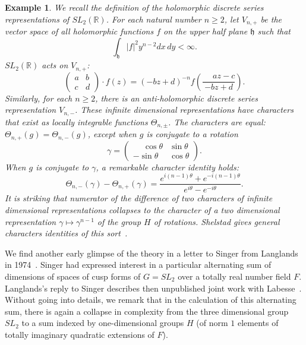 \documentclass[brochure,english,12pt]{bourbaki}
\theoremstyle{plain}
\newtheorem{example}[equation]{Example}
\newcommand{\ring}[1]{\mathbb{#1}}
\begin{document}
\begin{example}\label{ex:sl2}  
  We recall the definition of the holomorphic discrete series
  representations of $SL_2(\ring{R})$.  For each natural number $n\ge
  2$, let $V_{n,+}$ be the vector space of all holomorphic functions
  $f$ on the upper half plane ${\mathfrak h}$ such that
\[
\int_{\mathfrak h} |f|^2 y^{n-2} dx\, dy < \infty.
\]
$SL_2(\ring{R})$ acts on $V_{n,+}$:
\[
\begin{pmatrix} a & b \\ c & d \end{pmatrix} \cdot f(z) = 
(-b z + d ) ^{-n} f (\frac{\phantom{-}a z - c}{-b z + d}).
\]
Similarly, for each $n\ge 2$,  there is an anti-holomorphic discrete series
representation  $V_{n,-}$.  These infinite
dimensional representations have characters that exist as locally integrable
functions $\Theta_{n,\pm}$.  The characters are equal:
$\Theta_{n,+}(g)=\Theta_{n,-}(g)$, except when $g$ is conjugate to a
rotation
\[
\gamma = 
\begin{pmatrix} \phantom{-}\cos\theta & \sin\theta \\ -\sin\theta & \cos\theta\end{pmatrix}.
\] 
When $g$ is conjugate to $\gamma$, a remarkable character identity holds:
\begin{equation}\label{eqn:discrete-series}
\Theta_{n,-}(\gamma) - \Theta_{n,+}(\gamma) = 
\frac{e^{i (n-1) \theta} + e^{- i (n-1) \theta}}{e^{i\theta}-e^{-i\theta}}.
\end{equation}
It is striking that numerator of the difference of two characters of
infinite dimensional representations collapses to the character of a two
dimensional representation $\gamma\mapsto \gamma^{n-1}$ of the group $H$ of
rotations.  Shelstad gives general characters identities of this
sort~\cite{Shelstad:OI}. %
\end{example}

We find another early glimpse of the theory in a letter to Singer from
Langlands in 1974~\cite{L:singer:1974}.  Singer had expressed interest
in a particular alternating sum of dimensions of spaces of cusp forms
of $G=SL_2$ over a totally real number field $F$.  Langlands's reply
to Singer describes then unpublished joint work with
Labesse~\cite{LL:1979}.  Without going into details, we remark that in
the calculation of  this alternating sum, there is again a collapse in
complexity from the three dimensional group $SL_2$ to a sum indexed by
one-dimensional groups $H$ (of norm $1$ elements of totally imaginary
quadratic extensions of $F$).
\end{document}
